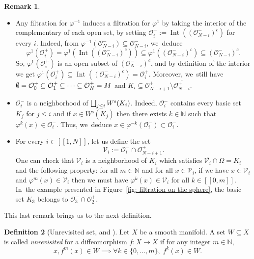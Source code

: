 \documentclass[JEP,XML,SOM,Unicode,NoEqCountersInSection,NoFloatCountersInSection,published]{cedram}
\let\oldbigsqcup\bigsqcup
\renewcommand{\bigsqcup}{\mathop{\textstyle\oldbigsqcup}\displaylimits}
\newcommand{\lcr}{[\![}
\newcommand{\rcr}{]\!]}
\newcommand{\rs}{\mathrm{s}}
\theoremstyle{definition}
\newtheorem{definition}{Definition}[section]
\newtheorem{remark}[definition]{Remark}
\theoremstyle{plain}
\newcommand{\N}{\mathbb{N}}
\newcommand{\Ocal}{\mathcal{O}}
\newcommand{\Vcal}{\mathcal{V}}
\DeclareMathOperator{\Int}{Int}
\begin{document}
\skpt
\begin{remark}\label{rk: filtration}
\begin{itemize}
\item Any filtration for $\varphi^{-1}$ induces a filtration for $\varphi^{1}$ by taking the interior of the complementary of each open set, \ie by setting $\Ocal_{i}^{+}:= \Int \left(\left(\Ocal_{N-i}^{-} \right)^c \right)$ for every $i$. Indeed, from $\varphi^{-1} \left(\Ocal_{N-i}^- \right) \subseteq \Ocal_{N-i}^-$, we~deduce
\[
\varphi^1 (\Ocal_{i}^+) = \varphi^1 \left(\Int \left(\left(\Ocal_{N-i}^- \right)^c \right) \right) \subseteq \varphi^1 \left(\left(\Ocal_{N-i}^- \right)^c \right) \subseteq \left(\Ocal_{N-i}^- \right)^c.
\]
So, $\varphi^1 (\Ocal_{i}^+)$ is an open subset of $\left(\Ocal_{N-i}^- \right)^c$, and by definition of the interior we get $\varphi^1 (\Ocal_{i}^+) \subseteq \Int \left(\left(\Ocal_{N-i}^- \right)^c \right) = \Ocal_{i}^+$.
Moreover, we~still have $\emptyset = \Ocal_0^+ \subseteq \Ocal_{1}^+ \subseteq \cdots \subseteq \Ocal_N^+ =\nobreak M$ and $K_{i} \subseteq \Ocal_{N-i+1}^+ \setminus \overline{\Ocal_{N-i}^+}$.
\item $\Ocal_i^- $ is a neighborhood of $\bigsqcup_{j\leq i} W^\rs (K_i)$. Indeed, $\Ocal_i^- $ contains every basic set $K_j$ for $j \leq i$ and if
$x \in W^\rs (K_j)$ then there exists $k \in \N$ such that $\varphi^k (x) \in \Ocal_i^-$. Thus, we~deduce $x \in \varphi^{-k} (\Ocal_i^-) \subset \Ocal_i^-$.
\item For every $i\in\lcr1,N\rcr$, let us define the set
\[
\Vcal_i:= \Ocal_i^- \cap \Ocal_{N-i+1}^+.
\]
One can check that $\Vcal_i$ is a neighborhood of $K_i$ which satisfies $\overline{\Vcal_i}\cap \Omega = K_i$ and the following property: for all $m \in \N$ and for all $x \in \Vcal_i$, if we have $x \in \Vcal_i$ and $\varphi^m (x) \in \Vcal_i$ then we must have $\varphi^k (x) \in \Vcal_i$ for all $k\in\lcr0,m\rcr$. In~the example presented in Figure~\ref{fig: filtration on the sphere}, the basic set $K_3$ belongs to $\Ocal_3^- \cap \Ocal_2^+$.
\end{itemize}
\end{remark}

This last remark brings us to the next definition.

\begin{definition}[{Unrevisited set, \cite[p.\,463]{robbin} and \cite{shub}}]Let $X$ be a smooth manifold. A set $W \subseteq X$ is called \emph{unrevisited} for a diffeomorphism $f: X \to X$ if for any integer $m \in \N$,
\[
x, f^m (x) \in W \implies \forall k \in \{0,\dots,m \},\; f^k (x) \in W.
\]
\end{definition}
\end{document}
